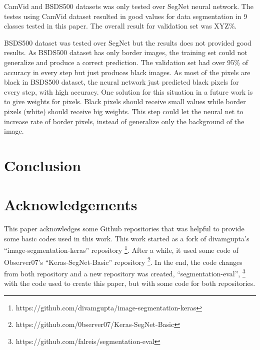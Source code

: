 \documentclass[10pt,twocolumn,letterpaper]{article}
\begin{document}
CamVid and BSDS500 datasets was only tested over SegNet neural network. The testes using CamVid dataset resulted in good values for data segmentation in 9 classes tested in this paper. The overall result for validation set was XYZ\%.

BSDS500 dataset was tested over SegNet but the results does not provided good results. As BSDS500 dataset has only border images, the training set could not generalize and produce a correct prediction. The validation set had over 95\% of accuracy in every step but just produces black images. As most of the pixels are black in BSDS500 dataset, the neural network just predicted black pixels for every step, with high accuracy. One solution for this situation in a future work is to give weights for pixels. Black pixels should receive small values while border pixels (white) should receive big weights. This step could let the neural net to increase rate of border pixels, instead of generalize only the background of the image.

\section{Conclusion} \label{sec:conclusion}



\section{Acknowledgements} \label{sec:acknowledgements}

This paper acknowledges some Github repositories that was helpful to provide some basic codes used in this work. This work started as a fork of divamgupta's ``image-segmentation-keras'' repository \footnote{https://github.com/divamgupta/image-segmentation-keras}. After a while, it used some code of Observer07's ``Keras-SegNet-Basic'' repository \footnote{https://github.com/0bserver07/Keras-SegNet-Basic}. In the end, the code changes from both repository and a new repository was created, ``segmentation-eval'', \footnote{https://github.com/falreis/segmentation-eval} with the code used to create this paper, but with some code for both repositories.

{\small


}
\end{document}
